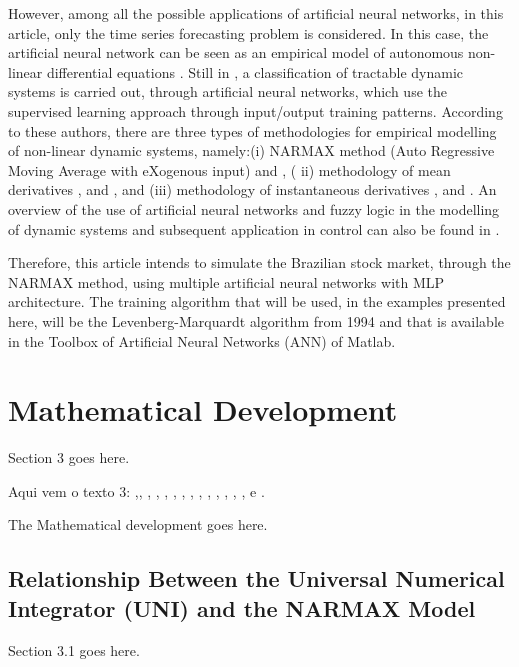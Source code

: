 \documentclass[journal,article,submit,pdftex,moreauthors]{Definitions/mdpi}
\begin{document}
However, among all the possible applications of artificial neural networks, in this article, only the time series forecasting problem is considered. In this case, the artificial neural network can be seen as an empirical model of autonomous non-linear differential equations \cite{ref4}. Still in \cite{ref4}, a classification of tractable dynamic systems is carried out, through artificial neural networks, which use the supervised learning approach through input/output training patterns. According to these authors, there are three types of methodologies for empirical modelling of non-linear dynamic systems, namely:(i) NARMAX method (Auto Regressive Moving Average with eXogenous input) \cite{ref5} and \cite{ref6}, ( ii) methodology of mean derivatives \cite{ref7, ref8}, and \cite{9}, and (iii) methodology of instantaneous derivatives \cite{ref10, ref11, ref12, ref13}, and \cite{ref14}. An overview of the use of artificial neural networks and fuzzy logic in the modelling of dynamic systems and subsequent application in control can also be found in \cite{ref15}.

Therefore, this article intends to simulate the Brazilian stock market, through the NARMAX method, using multiple artificial neural networks with MLP architecture. The training algorithm that will be used, in the examples presented here, will be the Levenberg-Marquardt \cite{ref16} algorithm from 1994 and that is available in the Toolbox of Artificial Neural Networks (ANN) of Matlab.    

\section{Mathematical Development}

Section 3 goes here.

Aqui vem o texto 3: \cite{ref1},\cite{ref2}, \cite{ref3}, \cite{ref4}, \cite{ref5}, \cite{ref6}, \cite{ref7}, \cite{ref8}, \cite{ref9}, \cite{ref10}, \cite{ref11}, \cite{ref12}, \cite{ref13}, \cite{ref14}, \cite{ref15} e \cite{ref16}.

The Mathematical development goes here.

\subsection{Relationship Between the Universal Numerical Integrator (UNI) and the NARMAX Model}

Section 3.1 goes here.
\end{document}
